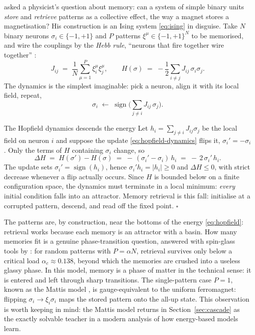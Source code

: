 \citet{hopfield1982neural} asked a physicist's question about memory: can
a system of simple binary units \emph{store} and \emph{retrieve} patterns
as a collective effect, the way a magnet stores a magnetisation? His
construction is an Ising system \eqref{eq:ising} in disguise. Take $N$
binary neurons $\sigma_i \in \{-1,+1\}$ and $P$ patterns
$\xi^\mu \in \{-1,+1\}^N$ to be memorised, and wire the couplings by the
\emph{Hebb rule}, ``neurons that fire together wire together''
\citep{hebb1949organization}:
\begin{equation}
  J_{ij} \;=\; \frac{1}{N} \sum_{\mu=1}^{P} \xi_i^\mu \xi_j^\mu ,
  \qquad
  H(\sigma) \;=\; -\frac{1}{2}\sum_{i \neq j} J_{ij}\, \sigma_i \sigma_j .
  \label{eq:hopfield}
\end{equation}
The dynamics is the simplest imaginable: pick a neuron, align it with its
local field, repeat,
\begin{equation}
  \sigma_i \;\leftarrow\; \operatorname{sign}\Big( \textstyle\sum_{j \neq i}
  J_{ij}\, \sigma_j \Big).
  \label{eq:hopfield-dynamics}
\end{equation}

\begin{toolbox}{The Hopfield dynamics descends the energy}
Let $h_i = \sum_{j \neq i} J_{ij} \sigma_j$ be the local field on neuron
$i$ and suppose the update \eqref{eq:hopfield-dynamics} flips it,
$\sigma_i' = -\sigma_i$. Only the terms of $H$ containing $\sigma_i$
change, so
\begin{equation*}
  \Delta H
  \;=\; H(\sigma') - H(\sigma)
  \;=\; -\,(\sigma_i' - \sigma_i)\, h_i
  \;=\; -\,2\,\sigma_i'\, h_i .
\end{equation*}
The update sets $\sigma_i' = \operatorname{sign}(h_i)$, hence
$\sigma_i' h_i = |h_i| \geq 0$ and $\Delta H \leq 0$, with strict
decrease whenever a flip actually occurs. Since $H$ is bounded below on a
finite configuration space, the dynamics must terminate in a local
minimum: \emph{every} initial condition falls into an attractor. Memory
retrieval is this fall: initialise at a corrupted pattern, descend, and
read off the fixed point. \hfill$\square$
\end{toolbox}

The patterns are, by construction, near the bottoms of the energy
\eqref{eq:hopfield}: retrieval works because each memory is an attractor
with a basin. How many memories fit is a genuine phase-transition
question, answered with spin-glass tools by \citet{amit1985storing}: for
random patterns with $P = \alpha N$, retrieval survives only below a
critical load $\alpha_c \approx 0.138$, beyond which the memories are
crushed into a useless glassy phase. In this model, memory is a phase
of matter in the technical sense: it is entered and left through sharp
transitions. The
single-pattern case $P=1$, known as the Mattis model
\citep{mattis1976solvable}, is gauge-equivalent to the uniform
ferromagnet: flipping $\sigma_i \to \xi_i \sigma_i$ maps the stored
pattern onto the all-up state. This observation is worth keeping in mind:
the Mattis model returns in Section~\ref{sec:cascade} as the exactly
solvable teacher in a modern analysis of how energy-based models learn.

